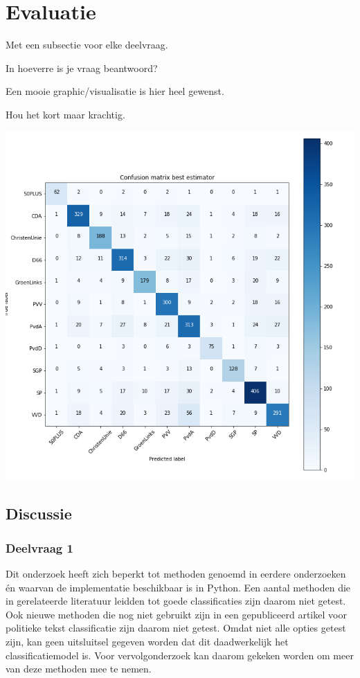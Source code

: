 \section{Evaluatie}
\label{sec:eva}

Met een subsectie voor elke deelvraag.

In hoeverre is je vraag beantwoord?

Een mooie graphic/visualisatie is hier heel gewenst.

Hou het kort maar krachtig.


\includegraphics[width=0.6\paperwidth]{Verslag/confusionmatrix.png}

\subsection{Discussie}
\subsubsection{Deelvraag 1}
Dit onderzoek heeft zich beperkt tot methoden genoemd in eerdere onderzoeken én waarvan de implementatie beschikbaar is in Python. Een aantal methoden die in gerelateerde literatuur leidden tot goede classificaties zijn daarom niet getest. Ook nieuwe methoden die nog niet gebruikt zijn in een gepubliceerd artikel voor politieke tekst classificatie zijn daarom niet getest. Omdat niet alle opties getest zijn, kan geen uitsluitsel gegeven worden dat dit daadwerkelijk het classificatiemodel is. Voor vervolgonderzoek kan daarom gekeken worden om meer van deze methoden mee te nemen.